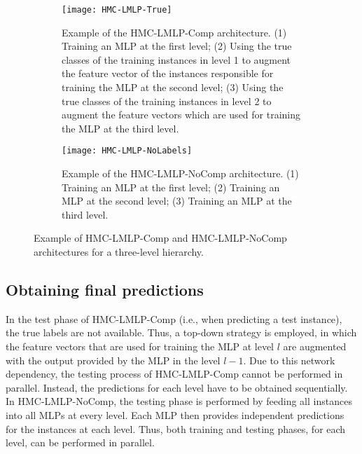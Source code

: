 \begin{figure*}[!htpb]
        \begin{subfigure}[b]{0.48\textwidth}
                \centering
                \texttt{[image: HMC-LMLP-True]}
                \caption{Example of the HMC-LMLP-Comp architecture. (1) Training an MLP at the first level; (2) Using the true classes of the training instances in level 1 to augment the feature vector of the instances responsible for training the MLP at the second level; (3) Using the true classes of the training instances in level 2 to augment the feature vectors which are used for training the MLP at the third level.}
                \label{fig:HMC-LMLP-Comp}
        \end{subfigure}
		\hspace{10pt}
        \begin{subfigure}[b]{0.48\textwidth}
                \centering
                \texttt{[image: HMC-LMLP-NoLabels]}
                \caption{Example of the HMC-LMLP-NoComp architecture. (1) Training an MLP at the first level; (2) Training an MLP at the second level; (3) Training an MLP at the third level.}
                \label{fig:HMC-LMLP-NoComp}
        \end{subfigure}
        \caption{Example of HMC-LMLP-Comp and HMC-LMLP-NoComp architectures for a three-level hierarchy.}
        \label{fig:HMC-LMLP}
\end{figure*}

\subsection{Obtaining final predictions}

In the test phase of HMC-LMLP-Comp (i.e., when predicting a test instance), the true labels are not available. Thus, a top-down strategy is employed, in which the feature vectors that are used for training the MLP at level $l$ are augmented with the output provided by the MLP in the level $l-1$. Due to this network dependency, the testing process of HMC-LMLP-Comp cannot be performed in parallel. Instead, the predictions for each level have to be obtained sequentially. In HMC-LMLP-NoComp, the testing phase is performed by feeding all instances into all MLPs at every level. Each MLP then provides independent predictions for the instances at each level. Thus, both training and testing phases, for each level, can be performed in parallel.

